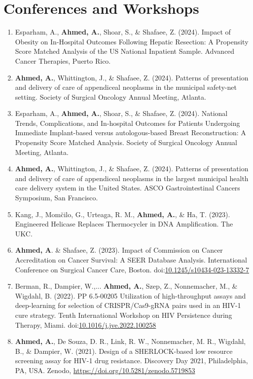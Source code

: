 \documentclass[letterpaper,11pt]{article}
\newcommand{\resumeItem}[2]{
  \item\small{
    \textbf{#1}{ #2 \vspace{-2pt}}
  }
}
\newcommand{\resumeSubItem}[2]{\resumeItem{#1}{#2}\vspace{-4pt}}
\begin{document}
\section{Conferences and Workshops}
  \begin{enumerate}[leftmargin=*]
  \resumeSubItem{}
    {Esparham, A., \textbf{Ahmed, A.}, Shoar, S., \& Shafaee, Z. (2024). Impact of Obesity on In-Hospital Outcomes Following Hepatic Resection: A Propensity Score Matched Analysis of the US National Inpatient Sample. Advanced Cancer Therapies, Puerto Rico.}
  \resumeSubItem{}
    {\textbf{Ahmed, A.}, Whittington, J., \& Shafaee, Z. (2024). Patterns of presentation and delivery of care of appendiceal neoplasms in the municipal safety-net setting. Society of Surgical Oncology Annual Meeting, Atlanta.}
  \resumeSubItem{}
    {Esparham, A., \textbf{Ahmed, A.}, Shoar, S., \& Shafaee, Z. (2024). National Trends, Complications, and In-hospital Outcomes for Patients Undergoing Immediate Implant-based versus autologous-based Breast Reconstruction: A Propensity Score Matched Analysis. Society of Surgical Oncology Annual Meeting, Atlanta.}
  \resumeSubItem{}
    {\textbf{Ahmed, A.}, Whittington, J., \& Shafaee, Z. (2024). Patterns of presentation and delivery of care of appendiceal neoplasms in the largest municipal health care delivery system in the United States. ASCO Gastrointestinal Cancers Symposium, San Francisco.}
  \resumeSubItem{}
    {Kang, J., Mom\u cilo, G., Urteaga, R. M., \textbf{Ahmed, A.}, \& Ha, T. (2023). Engineered Helicase Replaces Thermocycler in DNA Amplification. The UKC.}
  \resumeSubItem{}
    {\textbf{Ahmed, A}. \& Shafaee, Z. (2023). Impact of Commission on Cancer Accreditation on Cancer Survival: A SEER Database Analysis. International Conference on Surgical Cancer Care, Boston. doi:\href{https://doi.org/10.1245/s10434-023-13332-7}{10.1245/s10434-023-13332-7}}
  \resumeSubItem{}
    {Berman, R., Dampier, W.,... \textbf{Ahmed, A.}, Szep, Z., Nonnemacher, M., \& Wigdahl, B. (2022). PP 6.5-00205 Utilization of high-throughput assays and deep-learning for selection of CRISPR/Cas9-gRNA pairs used in an HIV-1 cure strategy. Tenth International Workshop on HIV Persistence during Therapy, Miami. doi:\href{https://doi.org/10.1016/j.jve.2022.100258}{10.1016/j.jve.2022.100258}}
  \resumeSubItem{}
    {\textbf{Ahmed, A.}, De Souza, D. R., Link, R. W., Nonnemacher, M. R., Wigdahl, B., \& Dampier, W. (2021). Design of a SHERLOCK-based low resource screening assay for HIV-1 drug resistance. Discovery Day 2021, Philadelphia, PA, USA. Zenodo, \href{https://doi.org/10.5281/zenodo.5719853}{https://doi.org/10.5281/zenodo.5719853}}

\end{enumerate}
\end{document}
